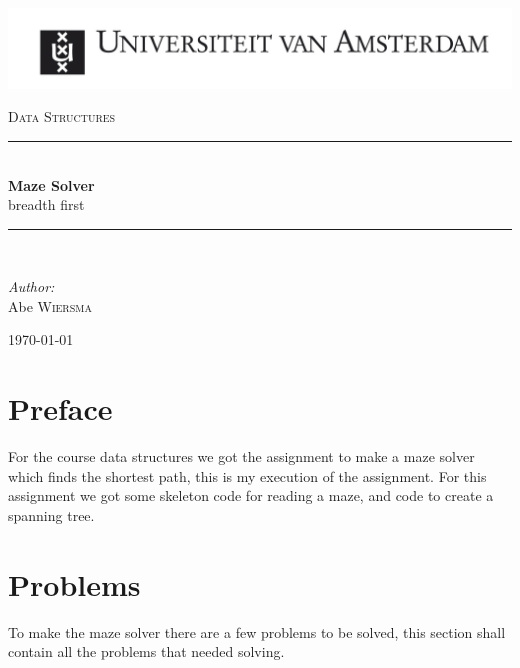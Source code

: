 \documentclass[pdftex,12pt,a4paper]{article}
\newcommand{\HRule}{\rule{\linewidth}{0.5mm}}
\begin{document}
\begin{titlepage}

\begin{flushleft}
\includegraphics[trim=23mm 0mm 0mm 0mm, width=1.2\textwidth]{./logo}\\[1cm]   
\end{flushleft}
\begin{center}
\textsc{\Large Data Structures}\\[0.5cm]


\HRule \\[0.4cm]
{ \huge \bfseries Maze Solver }\\breadth first

\HRule \\[1.5cm]

\begin{minipage}{0.4\textwidth}
\begin{flushleft} \large
\emph{Author:}\\
 Abe \textsc{Wiersma}
\end{flushleft}
\end{minipage}
\begin{minipage}{0.4\textwidth}
\begin{flushright} \large
\end{flushright}
\end{minipage}

\vfill

{\large \today}

\end{center}
\end{titlepage}
\topmargin=-0.5in 
\textheight=25cm
\pagebreak

\tableofcontents
\pagebreak

\section{Preface}
For the course data structures we got the assignment to make a maze solver which finds the shortest path, this is my execution of the assignment.
For this assignment we got some skeleton code for reading a maze, and code to create a spanning tree. 

\section{Problems}
To make the maze solver there are a few problems to be solved, this section shall contain all the problems that needed solving.
\end{document}
